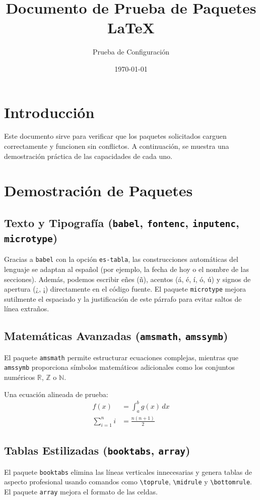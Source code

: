 \documentclass{article}
\title{Documento de Prueba de Paquetes LaTeX}
\author{Prueba de Configuración}
\date{\today}
\begin{document}
\maketitle

\section{Introducción}
Este documento sirve para verificar que los paquetes solicitados carguen correctamente y funcionen sin conflictos. A continuación, se muestra una demostración práctica de las capacidades de cada uno.

\section{Demostración de Paquetes}

\subsection{Texto y Tipografía (\texttt{babel}, \texttt{fontenc}, \texttt{inputenc}, \texttt{microtype})}
Gracias a \texttt{babel} con la opción \texttt{es-tabla}, las construcciones automáticas del lenguaje se adaptan al español (por ejemplo, la fecha de hoy o el nombre de las secciones). Además, podemos escribir eñes (ñ), acentos (á, é, í, ó, ú) y signos de apertura ($\text{¿, ¡}$) directamente en el código fuente. El paquete \texttt{microtype} mejora sutilmente el espaciado y la justificación de este párrafo para evitar saltos de línea extraños.

\subsection{Matemáticas Avanzadas (\texttt{amsmath}, \texttt{amssymb})}
El paquete \texttt{amsmath} permite estructurar ecuaciones complejas, mientras que \texttt{amssymb} proporciona símbolos matemáticos adicionales como los conjuntos numéricos $\mathbb{R}$, $\mathbb{Z}$ o $\mathbb{N}$.

Una ecuación alineada de prueba:
\begin{align}
    f(x) &= \int_{a}^{b} g(x) \, dx \\
    \sum_{i=1}^{n} i &= \frac{n(n+1)}{2}
\end{align}

\subsection{Tablas Estilizadas (\texttt{booktabs}, \texttt{array})}
El paquete \texttt{booktabs} elimina las líneas verticales innecesarias y genera tablas de aspecto profesional usando comandos como \texttt{\textbackslash toprule}, \texttt{\textbackslash midrule} y \texttt{\textbackslash bottomrule}. El paquete \texttt{array} mejora el formato de las celdas.
\end{document}
